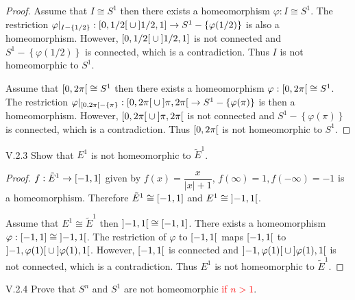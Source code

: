 \begin{proof}
	Assume that \( I \cong S^{1} \) then there exists a homeomorphism \( \varphi: I \cong S^{1} \). The restriction \( \varphi\vert_{I - \left\{ 1/2 \right\}}: \left\lbrack{0, 1/2}\right\lbrack \cup \left\rbrack{1/2, 1}\right\rbrack \to S^{1} - \left\{ \varphi(1/2) \right\} \) is also a homeomorphism. However, \( \left\lbrack{0, 1/2}\right\lbrack \cup \left\rbrack{1/2, 1}\right\rbrack \) is not connected and \( S^{1} - \left\{ \varphi(1/2) \right\} \) is connected, which is a contradiction. Thus \( I \) is not homeomorphic to \( S^{1} \).

	Assume that \( \left\lbrack{0, 2\pi}\right\lbrack \cong S^{1} \) then there exists a homeomorphism \( \varphi: \left\lbrack{0, 2\pi}\right\lbrack \cong S^{1} \). The restriction \( \varphi\vert_{\left\lbrack{0, 2\pi}\right\lbrack - \left\{\pi\right\}}: \left\lbrack{0, 2\pi}\right\lbrack \cup \left\rbrack{\pi, 2\pi}\right\lbrack \to S^{1} - \left\{ \varphi(\pi) \right\} \) is then a homeomorphism. However, \( \left\lbrack{0, 2\pi}\right\lbrack \cup \left\rbrack{\pi, 2\pi}\right\lbrack \) is not connected and \( S^{1} - \left\{ \varphi(\pi) \right\} \) is connected, which is a contradiction. Thus \( \left\lbrack{0, 2\pi}\right\lbrack \) is not homeomorphic to \( S^{1} \).
\end{proof}

\begin{problem}{V.2.3}
Show that \( E^{1} \) is not homeomorphic to \( \tilde{E}^{1} \).
\end{problem}

\begin{proof}
	\( f: \tilde{E}^{1} \to \left\lbrack{-1, 1}\right\rbrack \) given by \( f(x) = \dfrac{x}{\left\vert x \right\vert + 1} \), \( f(\infty) = 1, f(-\infty) = -1 \) is a homeomorphism. Therefore \( \tilde{E}^{1} \cong \left\lbrack{-1, 1}\right\rbrack \) and \( E^{1} \cong \left\rbrack{-1, 1}\right\lbrack \).

	Assume that \( E^{1} \cong \tilde{E}^{1} \) then \( \left\rbrack{-1, 1}\right\lbrack \cong \left\lbrack{-1, 1}\right\rbrack \). There exists a homeomorphism \( \varphi: \left\lbrack{-1, 1}\right\rbrack \cong \left\rbrack{-1, 1}\right\lbrack \). The restriction of \( \varphi \) to \( \left\lbrack{-1, 1}\right\lbrack \) maps \( \left\lbrack{-1, 1}\right\lbrack \) to \( \left\rbrack{-1, \varphi(1)}\right\lbrack \cup \left\rbrack{\varphi(1), 1}\right\lbrack \). However, \( \left\lbrack{-1, 1}\right\lbrack \) is connected and \( \left\rbrack{-1, \varphi(1)}\right\lbrack \cup \left\rbrack{\varphi(1), 1}\right\lbrack \) is not connected, which is a contradiction. Thus \( E^{1} \) is not homeomorphic to \( \tilde{E}^{1} \).
\end{proof}

\begin{problem}{V.2.4}
Prove that \( S^{n} \) and \( S^{1} \) are not homeomorphic \textcolor{red}{if \( n > 1 \)}.
\end{problem}

